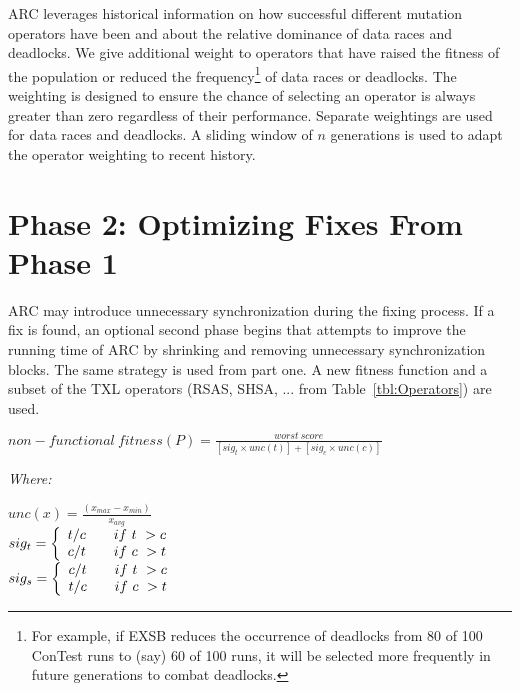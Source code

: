 \documentclass[runningheads,a4paper]{llncs}
\begin{document}
ARC leverages historical information on how successful different mutation operators have been and about the relative dominance of data races and deadlocks. We give additional weight to operators that have raised the fitness of the population or reduced the frequency\footnote{For example, if EXSB reduces the occurrence of deadlocks from 80 of 100 ConTest runs to (say) 60 of 100 runs, it will be selected more frequently in future generations to combat deadlocks.} of data races or deadlocks.   The weighting is designed to ensure the chance of selecting an operator is always greater than zero regardless of their performance. Separate weightings are used for data races and deadlocks. A sliding window of $n$ generations is used to adapt the operator weighting to recent history. 

\section{Phase 2: Optimizing Fixes From Phase 1}
\label{sec:Phase2Nonfunctional}

ARC may introduce unnecessary synchronization during the fixing process. If a fix is found, an optional second phase begins that attempts to improve the running time of ARC by shrinking and removing unnecessary synchronization blocks.  The same strategy is used from part one.  A new fitness function and a subset of the TXL operators (RSAS, SHSA, ... from Table~\ref{tbl:Operators}) are used. 

\begin{footnotesize}
\begin{center}
$non-functional\ fitness(P) = \frac{worst\ score}{[sig_t \times unc(t)] + [sig_c \times unc(c)]}$
\end{center}
\vspace{0.1cm} \textit{Where:} \vspace{0.1cm}
\end{footnotesize}
\begin{scriptsize}
\begin{center}
$unc(x) = \frac{(x_{max} - x_{min})}{x_{avg}}$ \\ \vspace{0.2cm}
$
 sig_t = \left\{
 \begin{array}{l l}
   t/c & \quad if\ t\ > c \\
   c/t & \quad if\ c\ > t \\
 \end{array} \right.
$ \\ \vspace{0.2cm}
$
 sig_s = \left\{
 \begin{array}{l l}
   c/t & \quad if\ t\ > c \\
   t/c & \quad if\ c\ > t \\
 \end{array} \right.
$ \\
\end{center}
\end{scriptsize}
\end{document}
